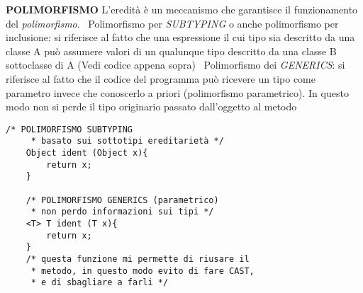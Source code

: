 \noindent \textbf{POLIMORFISMO} \newline
L'eredità è un meccanismo che garantisce il funzionamento del \textit{polimorfismo}.\newline
\textbullet\ Polimorfismo per \textit{SUBTYPING} o anche polimorfismo per inclusione: si riferisce al fatto che una espressione il cui tipo sia descritto da una classe A può assumere valori di un qualunque tipo descritto da una classe B sottoclasse di A (Vedi codice appena sopra)\newline 
\textbullet\ Polimorfismo dei \textit{GENERICS}: si riferisce al fatto che il codice del programma può ricevere un tipo come parametro invece che conoscerlo a priori (polimorfismo parametrico). In questo modo non si perde il tipo originario passato dall'oggetto al metodo \newline
\begin{lstlisting}[basicstyle=\small,]
	/* POLIMORFISMO SUBTYPING
	 * basato sui sottotipi ereditarietà */
	Object ident (Object x){
		return x;
	}

	/* POLIMORFISMO GENERICS (parametrico)
	 * non perdo informazioni sui tipi */
	<T> T ident (T x){
		return x;
	}
	/* questa funzione mi permette di riusare il 
	 * metodo, in questo modo evito di fare CAST,
	 * e di sbagliare a farli */
\end{lstlisting}

\newpage

